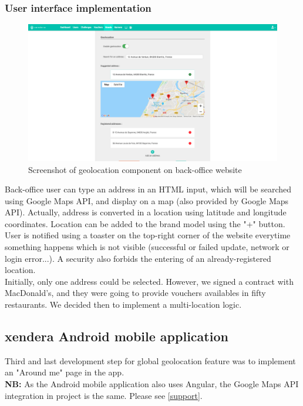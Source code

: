 \documentclass{article}
\begin{document}
                \subsubsection{User interface implementation}
                    \begin{figure}[H]
                        \includegraphics[width=\textwidth]{geolocation_web.png}
                        \caption{Screenshot of geolocation component on back-office website}
                    \end{figure}
                    Back-office user can type an address in an HTML input, which will be searched using Google Maps API, and display on a map (also provided
                    by Google Maps API). Actually, address is converted in a location using latitude and longitude coordinates.
                    Location can be added to the brand model using the "+" button. User is notified using a toaster on the 
                    top-right corner of the website everytime something happens which is not visible (successful or failed update, network or login error...).
                    A security also forbids the entering of an already-registered location.\\
                    Initially, only one address could be selected. However, we signed a contract with MacDonald's, and they were going to provide
                    vouchers availables in fifty restaurants. We decided then to implement a multi-location logic.
                    
            \subsection{xendera Android mobile application}
                Third and last development step for global geolocation feature was to implement an "Around me" page in the app.\\
                \textbf{NB: } As the Android mobile application also uses Angular, the Google Maps API integration in project is the same. Please see \ref{support}.
                
\end{document}
